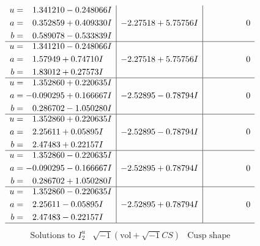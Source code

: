 \documentclass[1p]{elsarticle_modified}
\theoremstyle{definition}
\newcommand{\I}{\sqrt{-1}}
\begin{document}
$$\begin{array}{c|c|c}
\begin{aligned}
u &= \phantom{-}1.341210 - 0.248066 I \\
a &= \phantom{-}0.352859 + 0.409330 I \\
b &= \phantom{-}0.589078 - 0.533839 I\end{aligned}
 & -2.27518 + 5.75756 I & \phantom{-0.000000 } 0 \\ \hline\begin{aligned}
u &= \phantom{-}1.341210 - 0.248066 I \\
a &= \phantom{-}1.57949 + 0.74710 I \\
b &= \phantom{-}1.83012 + 0.27573 I\end{aligned}
 & -2.27518 + 5.75756 I & \phantom{-0.000000 } 0 \\ \hline\begin{aligned}
u &= \phantom{-}1.352860 + 0.220635 I \\
a &= -0.090295 + 0.166667 I \\
b &= \phantom{-}0.286702 - 1.050280 I\end{aligned}
 & -2.52895 - 0.78794 I & \phantom{-0.000000 } 0 \\ \hline\begin{aligned}
u &= \phantom{-}1.352860 + 0.220635 I \\
a &= \phantom{-}2.25611 + 0.05895 I \\
b &= \phantom{-}2.47483 + 0.22157 I\end{aligned}
 & -2.52895 - 0.78794 I & \phantom{-0.000000 } 0 \\ \hline\begin{aligned}
u &= \phantom{-}1.352860 - 0.220635 I \\
a &= -0.090295 - 0.166667 I \\
b &= \phantom{-}0.286702 + 1.050280 I\end{aligned}
 & -2.52895 + 0.78794 I & \phantom{-0.000000 } 0 \\ \hline\begin{aligned}
u &= \phantom{-}1.352860 - 0.220635 I \\
a &= \phantom{-}2.25611 - 0.05895 I \\
b &= \phantom{-}2.47483 - 0.22157 I\end{aligned}
 & -2.52895 + 0.78794 I & \phantom{-0.000000 } 0\\
 \hline 
 \end{array}$$\newpage$$\begin{array}{c|c|c}  
\text{Solutions to }I^u_{2}& \I (\text{vol} + \sqrt{-1}CS) & \text{Cusp shape}\\

\end{array}$$
\end{document}
